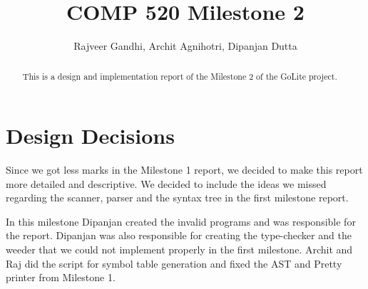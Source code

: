 \documentclass[preprint,12pt]{elsarticle}
\begin{document}
\begin{frontmatter}


\title{COMP 520 Milestone 2}




\author{Rajveer Gandhi, Archit Agnihotri, Dipanjan Dutta}

\begin{abstract}
This is a design and implementation report of the Milestone 2 of the GoLite project.
\end{abstract}

\end{frontmatter}

\linenumbers

\section{Design Decisions}

Since we got less marks in the Milestone 1 report, we decided to make this report more detailed and descriptive. We decided to include the ideas we missed regarding the scanner, parser and the syntax tree in the first milestone report. 

In this milestone Dipanjan created the invalid programs and was responsible for the report. Dipanjan was also responsible for creating the type-checker and the weeder that we could not implement properly in the first milestone. Archit and Raj did the script for symbol table generation and fixed the AST and Pretty printer from Milestone 1. 
\end{document}
